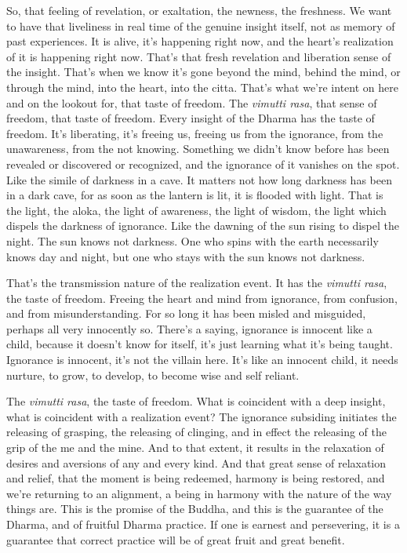 \documentclass[12pt,openany]{book}
\begin{document}
So, that feeling of revelation, or exaltation, the newness, the freshness. We want to have that liveliness in real time of the genuine insight itself, not as memory of past experiences. It is alive, it's happening right now, and the heart's realization of it is happening right now. That's that fresh revelation and liberation sense of the insight. That's when we know it's gone beyond the mind, behind the mind, or through the mind, into the heart, into the citta. That's what we’re intent on here and on the lookout for, that taste of freedom. The \textit{vi\-mut\-ti ra\-sa}, that sense of freedom, that taste of freedom. Every insight of the Dharma has the taste of freedom. It's liberating, it's freeing us, freeing us from the ignorance, from the unawareness, from the not knowing. Something we didn't know before has been revealed or discovered or recognized, and the ignorance of it vanishes on the spot. Like the simile of darkness in a cave. It matters not how long darkness has been in a dark cave, for as soon as the lantern is lit, it is flooded with light. That is the light, the aloka, the light of awareness, the light of wisdom, the light which dispels the darkness of ignorance. Like the dawning of the sun rising to dispel the night. The sun knows not darkness. One who spins with the earth necessarily knows day and night, but one who stays with the sun knows not darkness.

That's the transmission nature of the realization event. It has the \textit{vi\-mut\-ti ra\-sa}, the taste of freedom. Freeing the heart and mind from ignorance, from confusion, and from misunderstanding. For so long it has been misled and misguided, perhaps all very innocently so. \linebreak There’s a saying, ignorance is innocent like a child, because it doesn't know for itself, it's just learning what it’s being taught. Ignorance is innocent, it’s not the villain here. It’s like an innocent child, it needs nurture, to grow, to develop, to become wise and self reliant.

The \textit{vi\-mut\-ti ra\-sa}, the taste of freedom. What is coincident with a deep insight, what is coincident with a realization event? The ignorance subsiding initiates the releasing of grasping, the releasing of clinging, and in effect the releasing of the grip of the me and the mine. And to that extent, it results in the relaxation of desires and aversions of any and every kind. And that great sense of relaxation and relief, that the moment is being redeemed, harmony is being restored, and we’re returning to an alignment, a being in harmony with the nature of the way things are. This is the promise of the Buddha, and this is the guarantee of the Dharma, and of fruitful Dharma practice. If one is earnest and persevering, it is a guarantee that correct practice will be of great fruit and great benefit.
\end{document}
